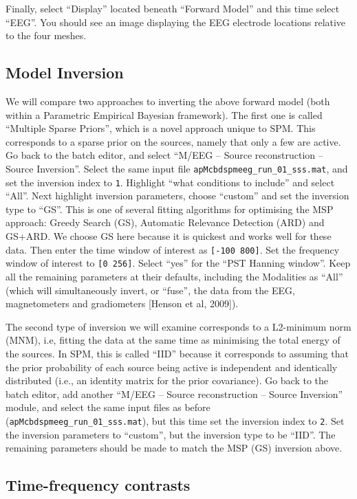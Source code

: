 Finally, select ``Display'' located beneath ``Forward Model'' and this time select ``EEG''. You should see an image displaying the EEG electrode locations relative to the four meshes. 

\subsection{Model Inversion}

We will compare two approaches to inverting the above forward model (both within a Parametric Empirical Bayesian framework). The first one is called ``Multiple Sparse Priors'', which is a novel approach unique to SPM. This corresponds to a sparse prior on the sources, namely that only a few are active. Go back to the batch editor, and select ``M/EEG -- Source reconstruction -- Source Inversion''. Select the same input file \texttt{apMcbdspmeeg\_run\_01\_sss.mat}, and set the inversion index to \texttt{1}. Highlight ``what conditions to include'' and select ``All''. Next highlight inversion parameters, choose ``custom'' and set the inversion type to ``GS''. This is one of several fitting algorithms for optimising the MSP approach: Greedy Search (GS), Automatic Relevance Detection (ARD) and GS+ARD. We choose GS here because it is quickest and works well for these data. Then enter the time window of interest as \texttt{[-100 800]}. Set the frequency window of interest to \texttt{[0 256]}. Select ``yes'' for the ``PST Hanning window''. Keep all the remaining parameters at their defaults, including the Modalities as ``All'' (which will simultaneously invert, or ``fuse'', the data from the EEG, magnetometers and gradiometers [Henson et al, 2009]).

The second type of inversion we will examine corresponds to a L2-minimum norm (MNM), i.e, fitting the data at the same time as minimising the total energy of the sources. In SPM, this is called ``IID'' because it corresponds to assuming that the prior probability of each source being active is independent and identically distributed (i.e., an identity matrix for the prior covariance). Go back to the batch editor, add another ``M/EEG -- Source reconstruction -- Source Inversion'' module, and select the same input files as before (\texttt{apMcbdspmeeg\_run\_01\_sss.mat}), but this time set the inversion index to \texttt{2}. Set the inversion parameters to ``custom'', but the inversion type to be ``IID''. The remaining parameters should be made to match the MSP (GS) inversion above.

\subsection{Time-frequency contrasts}

